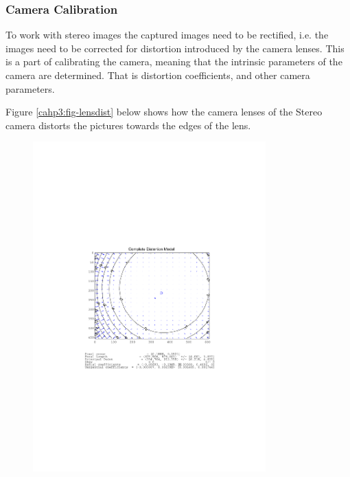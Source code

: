 \subsubsection{Camera Calibration}
To work with stereo images the captured images need to be rectified, i.e. the images need
to be corrected for distortion introduced by the camera lenses. This is a part of
calibrating the camera, meaning that the intrinsic parameters of the camera are
determined. That is distortion coefficients, and other camera parameters. 

Figure \ref{cahp3:fig-lensdist} below shows how the camera lenses of the Stereo camera distorts the pictures
towards the edges of the lens. 

\begin{figure}[htbp]
    \centering
    \includegraphics[width=0.8\textwidth]{pics/left_comp_dist}

\end{figure}
